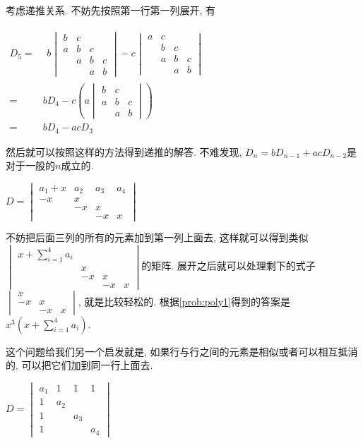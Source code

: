 \begin{sol*}
考虑递推关系. 不妨先按照第一行第一列展开, 有

$\begin{aligned}D_{5}= & \begin{aligned}b\begin{vmatrix}b & c\\
a & b & c\\
 & a & b & c\\
 &  & a & b
\end{vmatrix}-c\begin{vmatrix}a & c\\
 & b & c\\
 & a & b & c\\
 &  & a & b
\end{vmatrix}\end{aligned}
\\
= & bD_{4}-c\left(a\begin{vmatrix}b & c\\
a & b & c\\
 & a & b
\end{vmatrix}\right)\\
= & bD_{4}-acD_{3}
\end{aligned}
$ 

然后就可以按照这样的方法得到递推的解答. 不难发现, $D_{n}=bD_{n-1}+acD_{n-2}$是对于一般的$n$成立的. 
\end{sol*}
%
\begin{problem}
$D=\begin{vmatrix}a_{1}+x & a_{2} & a_{3} & a_{4}\\
-x & x\\
 & -x & x\\
 &  & -x & x
\end{vmatrix}$
\end{problem}

\begin{sol*}
不妨把后面三列的所有的元素加到第一列上面去, 这样就可以得到类似$\begin{vmatrix}x+\sum_{i=1}^{4}a_{i}\\
 & x\\
 & -x & x\\
 &  & -x & x
\end{vmatrix}$的矩阵. 展开之后就可以处理剩下的式子$\begin{vmatrix}x\\
-x & x\\
 & -x & x
\end{vmatrix}$, 就是比较轻松的. 根据\ref{prob:poly1}得到的答案是$x^{3}\left(x+\sum_{i=1}^{4}a_{i}\right)$. 

这个问题给我们另一个启发就是, 如果行与行之间的元素是相似或者可以相互抵消的, 可以把它们加到同一行上面去.
\end{sol*}
%
\begin{problem}
$D=\begin{vmatrix}a_{1} & 1 & 1 & 1\\
1 & a_{2}\\
1 &  & a_{3}\\
1 &  &  & a_{4}
\end{vmatrix}$
\end{problem}

